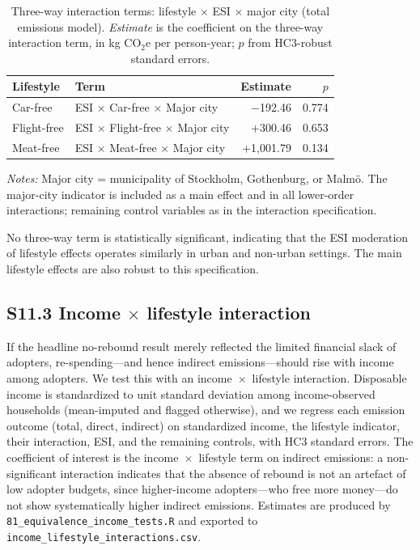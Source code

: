 \documentclass[12pt]{article}
\begin{document}
\begin{table}[!htbp]
\centering
\small
\caption{Three-way interaction terms: lifestyle $\times$ ESI $\times$ major city (total emissions model). \textit{Estimate} is the coefficient on the three-way interaction term, in kg CO$_2$e per person-year; $p$ from HC3-robust standard errors.}
\label{tab:urban_sensitivity}
\begin{tabular}{llrr}
\toprule
\textbf{Lifestyle} & \textbf{Term} & \textbf{Estimate} & \textbf{$p$} \\
\midrule
Car-free & ESI $\times$ Car-free $\times$ Major city & $-$192.46 & 0.774 \\
Flight-free & ESI $\times$ Flight-free $\times$ Major city & $+$300.46 & 0.653 \\
Meat-free & ESI $\times$ Meat-free $\times$ Major city & $+$1{,}001.79 & 0.134 \\
\bottomrule
\end{tabular}

\vspace{1mm}
\begin{flushleft}
\footnotesize
\textit{Notes:} Major city = municipality of Stockholm, Gothenburg, or Malm\"{o}. The major-city indicator is included as a main effect and in all lower-order interactions; remaining control variables as in the interaction specification.
\end{flushleft}
\end{table}

No three-way term is statistically significant, indicating that the ESI moderation of lifestyle effects operates similarly in urban and non-urban settings. The main lifestyle effects are also robust to this specification.

\subsection*{S11.3 Income $\times$ lifestyle interaction}
If the headline no-rebound result merely reflected the limited financial slack of adopters, re-spending---and hence indirect emissions---should rise with income among adopters. We test this with an income~$\times$~lifestyle interaction. Disposable income is standardized to unit standard deviation among income-observed households (mean-imputed and flagged otherwise), and we regress each emission outcome (total, direct, indirect) on standardized income, the lifestyle indicator, their interaction, ESI, and the remaining controls, with HC3 standard errors. The coefficient of interest is the income~$\times$~lifestyle term on indirect emissions: a non-significant interaction indicates that the absence of rebound is not an artefact of low adopter budgets, since higher-income adopters---who free more money---do not show systematically higher indirect emissions. Estimates are produced by \texttt{81\_equivalence\_income\_tests.R} and exported to \texttt{income\_lifestyle\_interactions.csv}.
\end{document}
